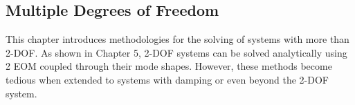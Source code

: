 \documentclass[12pt,letter]{article}
\begin{document}
	
	
	
	
	
	
	\subsection{Multiple Degrees of Freedom}
	
	This chapter introduces methodologies for the solving of systems with more than 2-DOF. As shown in Chapter 5, 2-DOF systems can be solved analytically using 2 EOM coupled through their mode shapes. However, these methods become tedious when extended to systems with damping or even beyond the 2-DOF system.
	
	
	
\end{document}

